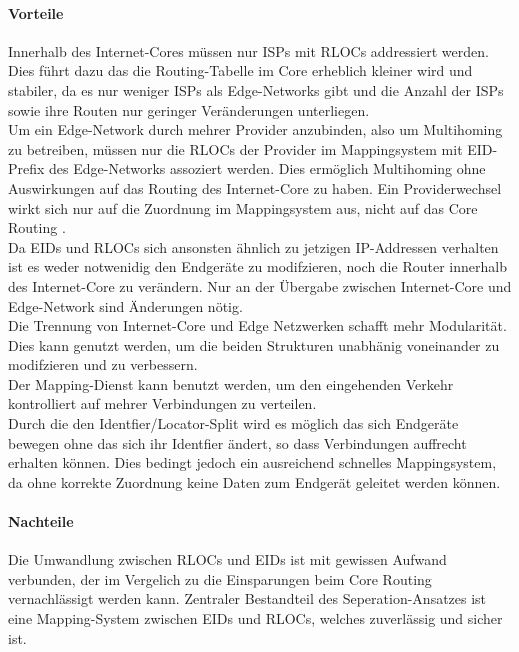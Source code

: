 \paragraph{Vorteile}
Innerhalb des Internet-Cores müssen nur ISPs mit RLOCs addressiert werden. Dies führt dazu das die Routing-Tabelle im Core erheblich kleiner wird und stabiler, da es nur weniger ISPs als Edge-Networks gibt und die Anzahl der ISPs sowie ihre Routen nur geringer Veränderungen unterliegen. \cite{jen:2008:start} \cite{deering:1996:map} \\
Um ein Edge-Network durch mehrer Provider anzubinden, also um Multihoming zu betreiben, müssen nur die RLOCs der Provider im Mappingsystem mit EID-Prefix des Edge-Networks assoziert werden. Dies ermöglich Multihoming ohne Auswirkungen auf das Routing des Internet-Core zu haben. Ein Providerwechsel wirkt sich nur auf die Zuordnung im  Mappingsystem aus, nicht auf das Core Routing \cite{farinacci:2009:LISP}.\\
Da EIDs und RLOCs sich ansonsten ähnlich zu jetzigen IP-Addressen verhalten ist es weder notwenidig den Endgeräte zu modifzieren, noch die Router innerhalb des Internet-Core zu verändern. Nur an der Übergabe zwischen Internet-Core und Edge-Network sind Änderungen nötig. \cite{jen:2008:start} \\
Die Trennung von Internet-Core und Edge Netzwerken schafft mehr Modularität. Dies kann genutzt werden, um die beiden Strukturen unabhänig voneinander zu modifzieren und zu verbessern.\\
Der Mapping-Dienst kann benutzt werden, um den eingehenden Verkehr kontrolliert auf mehrer Verbindungen zu verteilen. \\
Durch die den Identfier/Locator-Split wird es möglich das sich Endgeräte bewegen ohne das sich ihr Identfier ändert, so dass Verbindungen auffrecht erhalten können. Dies bedingt jedoch ein ausreichend schnelles Mappingsystem, da ohne korrekte Zuordnung keine Daten zum Endgerät geleitet werden können. \\

\paragraph{Nachteile}
Die Umwandlung zwischen RLOCs und EIDs ist mit gewissen Aufwand verbunden, der im Vergelich zu die Einsparungen beim Core Routing vernachlässigt werden kann. Zentraler Bestandteil des Seperation-Ansatzes ist eine Mapping-System zwischen EIDs und RLOCs, welches zuverlässig und sicher ist. 

